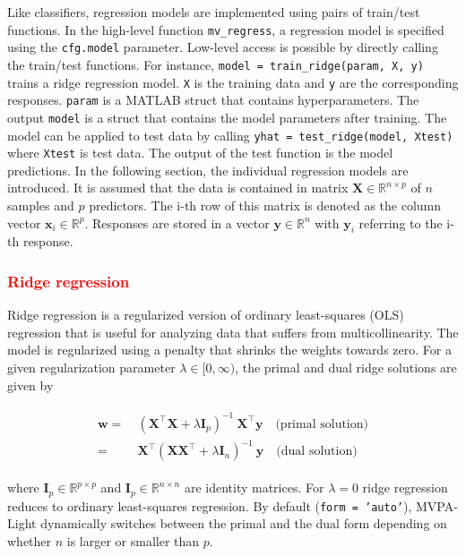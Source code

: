 \documentclass[utf8]{frontiersSCNS} %
\newcommand{\w}{\mathbf{w}}
\newcommand{\x}{\mathbf{x}}
\newcommand{\y}{\mathbf{y}}
\newcommand{\I}{\mathbf{I}}
\newcommand{\R}{\mathbb{R}}
\newcommand{\X}{\mathbf{X}}
\newcommand{\ttt}[1]{\texttt{#1}}
\newcommand{\red}[1]{\textcolor{red}{#1}}
\begin{document}
Like classifiers, regression models are implemented using pairs of train/test functions. In the high-level function \ttt{mv\_regress}, a regression model is specified using the \ttt{cfg.model} parameter. Low-level access is possible by directly calling the train/test functions. For instance, \ttt{model = train\_ridge(param, X, y)} trains a ridge regression model. \ttt{X} is the training data and \ttt{y} are the corresponding responses. \ttt{param} is a MATLAB struct that contains hyperparameters. The output \ttt{model} is a struct that contains the model parameters after training. The model can be applied to test data by calling \ttt{yhat = test\_ridge(model, Xtest)} where \ttt{Xtest} is test data. The output of the test function is the model predictions. In the following section, the individual regression models are introduced. It is assumed that the data is contained in matrix $\X\in\R^{n \times p}$ of $n$ samples and $p$ predictors. The i-th row of this matrix is denoted as the column vector $\x_i\in\R^p$. Responses are stored in a vector $\y\in\R^n$ with $\y_i$ referring to the i-th response.

\red{\subsubsection{Ridge regression}}

Ridge regression is a regularized version of ordinary least-squares (OLS) regression that is useful for analyzing data that suffers from multicollinearity. The model is regularized using a penalty that shrinks the weights towards zero. For a given regularization parameter $\lambda\in[0,\infty)$, the primal and dual ridge solutions are given by


\begin{align}
\begin{split}
\label{eq:ridge}
\w =\ & (\X^\top\X + \lambda\I_p)^{-1}\ \X^\top\y \quad\text{(primal solution)}\\
 =\ & \X^\top (\X\X^\top + \lambda\I_n)^{-1}\ \y \quad\text{(dual solution)}
\end{split}
\end{align}

where $\I_p\in\R^{p\times p}$ and $\I_p\in\R^{n\times n}$ are identity matrices. For $\lambda=0$ ridge regression reduces to ordinary least-squares regression. By default (\ttt{form = 'auto'}), MVPA-Light dynamically switches between the primal and the dual form depending on whether $n$ is larger or smaller than $p$.
\end{document}
